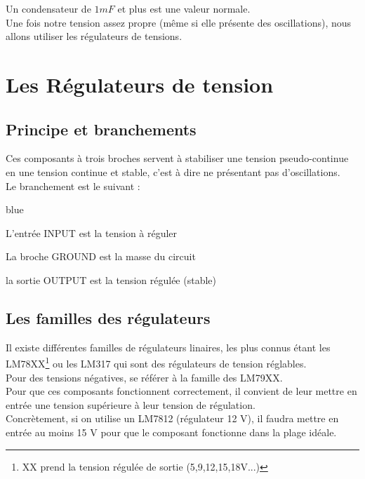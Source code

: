   Un condensateur de $1mF$ et plus est une valeur normale.\\
   Une fois notre tension assez propre (même si elle présente des oscillations), nous allons utiliser les régulateurs de tensions.

  \section{Les Régulateurs de tension}

  \subsection{Principe et branchements}
  Ces composants à trois broches servent à stabiliser une tension pseudo-continue en une tension continue et stable, c'est à dire ne présentant pas d'oscillations.\\


  Le branchement est le suivant : \\


  \begin{items}{blue}{\Triangle}
    \item L'entrée INPUT est la tension à réguler
    \item La broche GROUND est la masse du circuit
    \item la sortie OUTPUT est la tension régulée (stable)
\end{items}

\subsection{Les familles des régulateurs}

  Il existe différentes familles de régulateurs linaires, les plus connus étant les LM78XX\footnote{XX prend la tension régulée de sortie (5,9,12,15,18V...)} ou les LM317 qui sont des régulateurs de tension réglables.\\
  Pour des tensions négatives, se référer à la famille des LM79XX.\\

  Pour que ces composants fonctionnent correctement, il convient de leur mettre en entrée une tension supérieure à leur tension de régulation.\\

  Concrètement, si on utilise un LM7812 (régulateur 12 V), il faudra mettre en entrée au moins 15 V pour que le composant fonctionne dans la plage idéale.\\

